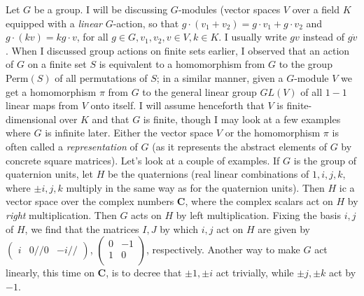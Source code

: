 \documentclass[10pt]{article}
\begin{document}
Let $G$ be a group. I will be discussing $G$-modules (vector spaces $V$
over a field $K$ equipped with a {\sl linear} $G$-action, so that
$g\cdot (v_1 + v_2) = g\cdot v_1 + g\cdot v_2$ and $g\cdot (kv) =
kg\cdot v$, for all $g\in G, v_1,v_2,v\in V, k\in K$. I usually write
$gv$ instead of $g\dot v$. When I discussed group actions on finite sets
earlier, I observed that an action of $G$ on a finite set $S$ is
equivalent to a homomorphism from $G$ to the group Perm$(S)$ of all
permutations of $S$; in a similar manner, given a $G$-module $V$ we get
a homomorphism $\pi$ from $G$ to the general linear group $GL(V)$ of all
$1-1$ linear maps from $V$ onto itself. I will assume henceforth that
$V$ is finite-dimensional over $K$ and that $G$ is finite, though I may
look at a few examples where $G$ is infinite later. Either the vector
space $V$ or the homomorphism $\pi$ is often called a {\sl
  representation} of $G$ (as it represents the abstract elements of $G$
by concrete square matrices). Let's look at a couple of examples. If $G$
is the group of quaternion units, let $H$ be the quaternions (real
linear combinations of $1,i,j,k$, where $\pm i,j,k$ multiply in the same
way as for the quaternion units). Then $H$ ic a vector space over the
complex numbers $\mathbf C$, where the complex scalars act on $H$ by
{\sl right} multiplication. Then $G$ acts on $H$ by left multiplication.
Fixing the basis $i,j$ of $H$, we find that the matrices $I,J$ by which
$i,j$ act on $H$ are given by $\begin{pmatrix} i&0// 0&
  -i// \end{pmatrix}$, $\begin{pmatrix} 0&-1\\ 1&0\\ \end{pmatrix}$,
respectively. Another way to make $G$ act linearly, this time on
$\mathbf C$, is to decree that $\pm 1,\pm i$ act trivially, while $\pm
j,\pm k$ act by $-1$.
\end{document}
